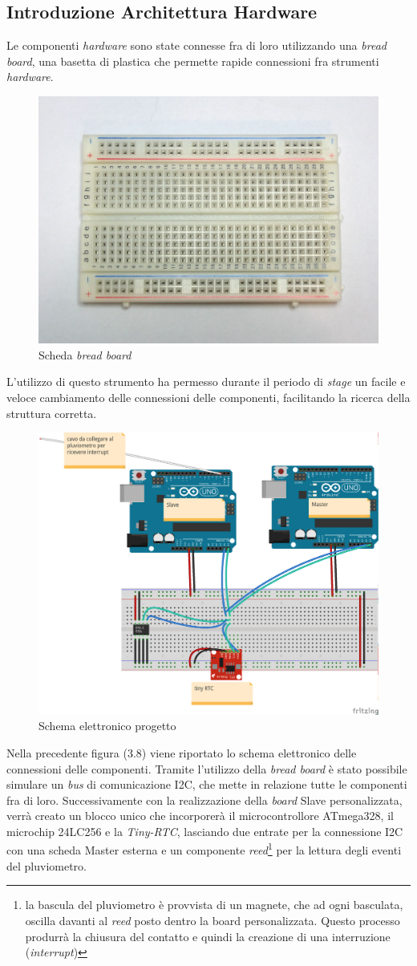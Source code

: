 \subsection{Introduzione Architettura Hardware}

Le componenti \textit{hardware} sono state connesse fra di loro utilizzando una \textit{bread board}, una basetta di plastica che permette rapide connessioni fra strumenti \textit{hardware}. 

\begin{figure}[htbp]
\centering
\includegraphics[width=.3\textwidth]{./capitoli/capitolo3/img/bread}
\caption{Scheda \textit{bread board}}
\end{figure}

L'utilizzo di questo strumento ha permesso durante il periodo di \textit{stage} un facile e veloce cambiamento delle connessioni delle componenti, facilitando la ricerca della struttura corretta.

\begin{figure}[htbp]
\centering
\includegraphics[width=.7\textwidth]{./capitoli/capitolo3/img/schema}
\caption{Schema elettronico progetto}
\end{figure}

Nella precedente figura (3.8) viene riportato lo schema elettronico delle connessioni delle componenti. Tramite l'utilizzo della \textit{bread board} è stato possibile simulare un \textit{bus} di comunicazione I2C, che mette in relazione tutte le componenti fra di loro. Successivamente con la realizzazione della \textit{board} Slave personalizzata, verrà creato un blocco unico che incorporerà il microcontrollore ATmega328, il microchip 24LC256 e la \textit{Tiny-RTC}, lasciando due entrate per la connessione I2C con una scheda Master esterna e un componente \textit{reed}\footnote{ la bascula del pluviometro è provvista di un magnete, che ad ogni basculata, oscilla davanti al \textit{reed} posto dentro la board personalizzata. Questo processo produrrà la chiusura del contatto e quindi la creazione di una interruzione (\textit{interrupt})} per la lettura degli eventi del pluviometro. 

